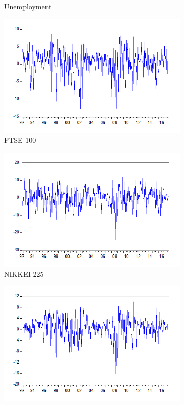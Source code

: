 \documentclass[11pt]{article}
\begin{document}
\begin{figure}
\begin{subfigure}[t]{0.31\textwidth}
	\caption{Unemployment} \label{fig:sune}
	\end{subfigure}	

	\begin{subfigure}[t]{0.31\textwidth}
	\centering
	\includegraphics[width=\linewidth]{s_ftse.png} 
	\caption{FTSE 100} \label{fig:sftse}
	\end{subfigure}
	\hfill
	\begin{subfigure}[t]{0.31\textwidth}
	\centering
	\includegraphics[width=\linewidth]{s_nik.png} 
	\caption{NIKKEI 225} \label{fig:snik}
	\end{subfigure}
	\hfill
	\begin{subfigure}[t]{0.31\textwidth}
	\centering
	\includegraphics[width=\linewidth]{s_sp.png} 

\end{subfigure}
\end{figure}
\end{document}
